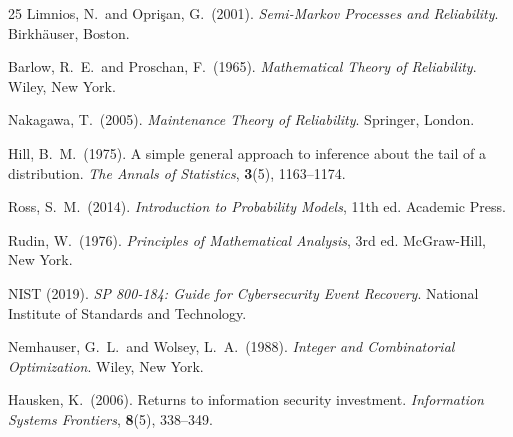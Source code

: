 \documentclass[12pt,a4paper]{article}
\theoremstyle{plain}
\theoremstyle{definition}
\theoremstyle{remark}
\begin{document}
\begin{thebibliography}{25}
Limnios, N.\ and Opri\c{s}an, G.\ (2001).
\textit{Semi-Markov Processes and Reliability}.
Birkh\"{a}user, Boston.

Barlow, R.\ E.\ and Proschan, F.\ (1965).
\textit{Mathematical Theory of Reliability}.
Wiley, New York.

Nakagawa, T.\ (2005).
\textit{Maintenance Theory of Reliability}.
Springer, London.

Hill, B.\ M.\ (1975).
A simple general approach to inference about the tail of a distribution.
\textit{The Annals of Statistics}, \textbf{3}(5), 1163--1174.

Ross, S.\ M.\ (2014).
\textit{Introduction to Probability Models}, 11th ed.
Academic Press.

Rudin, W.\ (1976).
\textit{Principles of Mathematical Analysis}, 3rd ed.
McGraw-Hill, New York.

NIST (2019).
\textit{SP 800-184: Guide for Cybersecurity Event Recovery}.
National Institute of Standards and Technology.

Nemhauser, G.\ L.\ and Wolsey, L.\ A.\ (1988).
\textit{Integer and Combinatorial Optimization}.
Wiley, New York.

Hausken, K.\ (2006).
Returns to information security investment.
\textit{Information Systems Frontiers}, \textbf{8}(5), 338--349.

\end{thebibliography}
\end{document}
